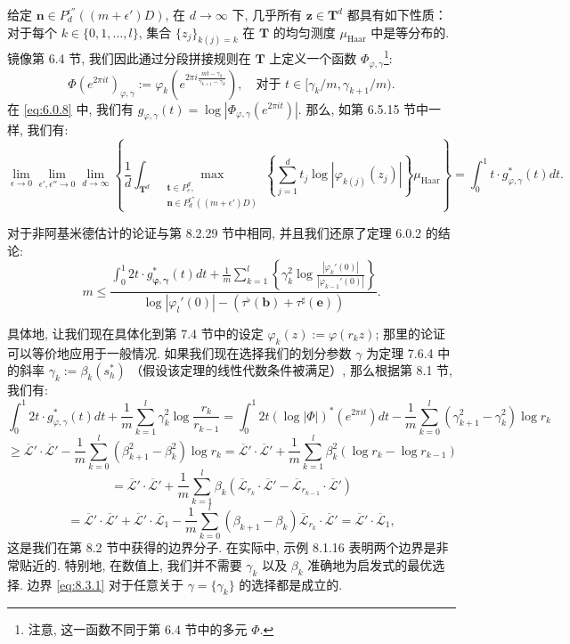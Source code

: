给定 \(\mathbf{n} \in P_d^{\epsilon''}((m+\epsilon')D)\), 
在 \(d \to \infty\) 下, 几乎所有 \(\mathbf{z} \in \mathbf{T}^d\) 
都具有如下性质：对于每个 \(k \in \{0, 1, \dots, l\}\), 
集合 \(\{z_j\}_{k(j)=k}\) 在 \(\mathbf{T}\) 的均匀测度 \(\mu_{\text{Haar}}\) 中是等分布的. 
镜像第 6.4 节, 我们因此通过分段拼接规则在 \(\mathbf{T}\) 上定义一个函数 \(\Phi_{\varphi,\gamma}\)\setcounter{footnote}{34}\footnote{注意, 这一函数不同于第 6.4 节中的多元 \(\Phi\).}:
\[ \Phi(e^{2\pi it})_{\varphi,\gamma} := \varphi_k\left(e^{2\pi i\frac{mt-\gamma_k}{\gamma_{k+1}-\gamma_k}}\right), \quad \text{对于 } t \in [\gamma_k/m, \gamma_{k+1}/m). \]
在 \eqref{eq:6.0.8} 中, 我们有 \(g_{\varphi,\gamma}(t) = \log |\Phi_{\varphi,\gamma}(e^{2\pi i t})|\). 
那么, 如第 6.5.15 节中一样, 我们有:
\[ \lim_{\epsilon \to 0} \lim_{\epsilon', \epsilon'' \to 0} \lim_{d \to \infty} \left\{ \frac{1}{d} \int_{\mathbf{T}^d} \max_{\substack{\mathbf{t} \in P_e^d, \\ \mathbf{n} \in P_d^{\epsilon''} ((m+\epsilon')D)}} \left\{ \sum_{j=1}^d t_j \log |\varphi_{k(j)}(z_j)| \right\} \mu_{\text{Haar}} \right\} = \int_0^1 t \cdot g_{\varphi, \gamma}^*(t) dt. \]

对于非阿基米德估计的论证与第 8.2.29 节中相同, 并且我们还原了定理 6.0.2 的结论:
\begin{equation}\label{eq:8.3.1}
m \leq \frac{\int_0^1 2t \cdot g_{\boldsymbol{\varphi}, \boldsymbol{\gamma}}^*(t) dt + \frac{1}{m} \sum_{k=1}^l \left\{ \gamma_k^2 \log \frac{|\varphi_k'(0)|}{|\varphi_{k-1}'(0)|} \right\}}{\log |\varphi_l'(0)| - (\tau^{\flat}(\mathbf{b}) + \tau^{\sharp}(\mathbf{e}))}.
\end{equation}

具体地, 让我们现在具体化到第 7.4 节中的设定 \(\varphi_k(z) := \varphi(r_k z)\); 
那里的论证可以等价地应用于一般情况. 
如果我们现在选择我们的划分参数 \(\gamma\) 为定理 7.6.4 中的斜率 \(\gamma_k := \beta_k(s_h^*)\) （假设该定理的线性代数条件被满足）, 
那么根据第 8.1 节, 我们有:
\[ \int_{0}^{1} 2t \cdot g_{\varphi,\gamma}^{*}(t) dt + \frac{1}{m} \sum_{k=1}^{l} \gamma_{k}^{2} \log \frac{r_{k}}{r_{k-1}} = \int_{0}^{1} 2t (\log |\Phi|)^{*} (e^{2\pi i t}) dt - \frac{1}{m} \sum_{k=0}^{l} (\gamma_{k+1}^{2} - \gamma_{k}^{2}) \log r_{k} \]
\[ \geq \overline{\mathcal{L}}' \cdot \overline{\mathcal{L}}' - \frac{1}{m} \sum_{k=0}^{l} (\beta_{k+1}^{2} - \beta_{k}^{2}) \log r_{k} = \overline{\mathcal{L}}' \cdot \overline{\mathcal{L}}' + \frac{1}{m} \sum_{k=1}^{l} \beta_{k}^{2} (\log r_{k} - \log r_{k-1}) \]
\[ = \overline{\mathcal{L}}' \cdot \overline{\mathcal{L}}' + \frac{1}{m} \sum_{k=1}^{l} \beta_{k} (\overline{\mathcal{L}}_{r_{k}} \cdot \overline{\mathcal{L}}' - \overline{\mathcal{L}}_{r_{k-1}} \cdot \overline{\mathcal{L}}') \]
\[ = \overline{\mathcal{L}}' \cdot \overline{\mathcal{L}}' + \overline{\mathcal{L}}' \cdot \overline{\mathcal{L}}_{1} - \frac{1}{m} \sum_{k=0}^{l} (\beta_{k+1} - \beta_{k}) \overline{\mathcal{L}}_{r_{k}} \cdot \overline{\mathcal{L}}' = \overline{\mathcal{L}}' \cdot \overline{\mathcal{L}}_{1}, \]
这是我们在第 8.2 节中获得的边界分子. 
在实际中, 示例 8.1.16 表明两个边界是非常贴近的. 
特别地, 在数值上, 我们并不需要 \(\gamma_k\) 以及 \(\beta_k\) 准确地为启发式的最优选择. 
边界 \eqref{eq:8.3.1} 对于任意关于 \(\gamma = {\{\gamma_k\}}\) 的选择都是成立的.